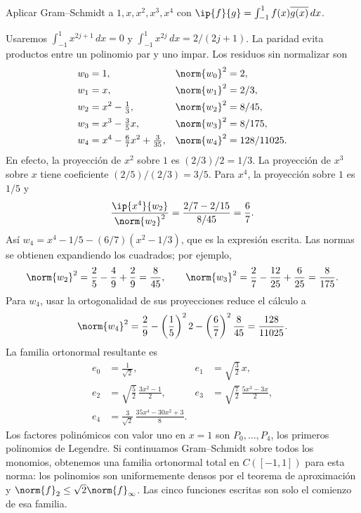 \begin{ejercicio}\label{ej:lectura-31-2}
Aplicar Gram--Schmidt a $1,x,x^{2},x^{3},x^{4}$ con $\ip{f}{g}=\int_{-1}^{1}f(x)\overline{g(x)}\,dx$.
\end{ejercicio}
\begin{solucion}
Usaremos $\int_{-1}^{1}x^{2j+1}\,dx=0$ y $\int_{-1}^{1}x^{2j}\,dx=2/(2j+1)$. La paridad evita productos entre un polinomio par y uno impar. Los residuos sin normalizar son
\begin{align*}
 w_0&=1, &\norm{w_0}^{2}&=2,\\
 w_1&=x, &\norm{w_1}^{2}&=2/3,\\
 w_2&=x^{2}-\tfrac13, &\norm{w_2}^{2}&=8/45,\\
 w_3&=x^{3}-\tfrac35x, &\norm{w_3}^{2}&=8/175,\\
 w_4&=x^{4}-\tfrac67x^{2}+\tfrac3{35}, &\norm{w_4}^{2}&=128/11025.
\end{align*}
En efecto, la proyección de $x^{2}$ sobre $1$ es $(2/3)/2=1/3$. La proyección de $x^{3}$ sobre $x$ tiene coeficiente $(2/5)/(2/3)=3/5$. Para $x^{4}$, la proyección sobre $1$ es $1/5$ y
\[
 \frac{\ip{x^{4}}{w_2}}{\norm{w_2}^{2}}
 =\frac{2/7-2/15}{8/45}=\frac67.
\]
Así $w_4=x^{4}-1/5-(6/7)(x^{2}-1/3)$, que es la expresión escrita. Las normas se obtienen expandiendo los cuadrados; por ejemplo,
\[
 \norm{w_2}^{2}=\frac25-\frac49+\frac29=\frac8{45},\qquad
 \norm{w_3}^{2}=\frac27-\frac{12}{25}+\frac6{25}=\frac8{175}.
\]
Para $w_4$, usar la ortogonalidad de sus proyecciones reduce el cálculo a
\[
 \norm{w_4}^{2}=\frac29-\left(\frac15\right)^2 2
 -\left(\frac67\right)^2\frac8{45}=\frac{128}{11025}.
\]
La familia ortonormal resultante es
\begin{align*}
 e_0&=\frac1{\sqrt2}, &
 e_1&=\sqrt{\frac32}\,x,\\
 e_2&=\sqrt{\frac52}\,\frac{3x^{2}-1}{2}, &
 e_3&=\sqrt{\frac72}\,\frac{5x^{3}-3x}{2},\\
 e_4&=\frac3{\sqrt2}\,\frac{35x^{4}-30x^{2}+3}{8}.
\end{align*}
Los factores polinómicos con valor uno en $x=1$ son $P_0,\dots,P_4$, los primeros polinomios de Legendre. Si continuamos Gram--Schmidt sobre todos los monomios, obtenemos una familia ortonormal total en $C([-1,1])$ para esta norma: los polinomios son uniformemente densos por el teorema de aproximación y $\norm{f}_2\leq\sqrt2\norm{f}_\infty$. Las cinco funciones escritas son solo el comienzo de esa familia.
\end{solucion}

